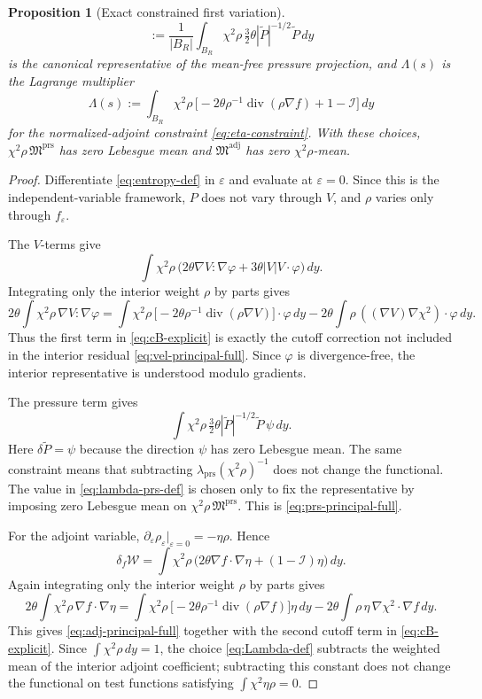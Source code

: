 \documentclass[11pt]{amsart}
\numberwithin{equation}{section}
\theoremstyle{plain}
\newtheorem{proposition}[theorem]{Proposition}
\theoremstyle{definition}
\theoremstyle{remark}
\newcommand{\Wloc}{\mathcal W}
\newcommand{\diver}{\operatorname{div}}
\begin{document}
\begin{proposition}[Exact constrained first variation]
\begin{equation}
	:=\frac1{|B_R|}\int_{B_R}\chi^2\rho\,
	\tfrac32\theta|\widetilde P|^{-1/2}\widetilde P\,dy
\end{equation}
is the canonical representative of the mean-free pressure projection, and
\(\Lambda(s)\) is the Lagrange multiplier
\begin{equation}\label{eq:Lambda-def}
	\Lambda(s):=\int_{B_R}\chi^2\rho\,
	\bigl[-2\theta\rho^{-1}\diver(\rho\nabla f)+1-\mathcal I\bigr]\,dy
\end{equation}
for the normalized-adjoint constraint \eqref{eq:eta-constraint}.  With these
choices, \(\chi^2\rho\,\mathfrak M^{\mathrm{prs}}\) has zero Lebesgue mean
and \(\mathfrak M^{\mathrm{adj}}\) has zero \(\chi^2\rho\)-mean.
\end{proposition}

\begin{proof}
Differentiate \eqref{eq:entropy-def} in \(\varepsilon\) and evaluate at
\(\varepsilon=0\).  Since this is the independent-variable framework,
\(P\) does not vary through \(V\), and \(\rho\) varies only through
\(f_\varepsilon\).

The \(V\)-terms give
\[
	\int\chi^2\rho\,
	\bigl(2\theta\nabla V:\nabla\varphi+3\theta|V|V\cdot\varphi\bigr)\,dy.
\]
Integrating only the interior weight \(\rho\) by parts gives
\[
	2\theta\int\chi^2\rho\,\nabla V:\nabla\varphi
	=\int\chi^2\rho\,
	\bigl[-2\theta\rho^{-1}\diver(\rho\nabla V)\bigr]\cdot\varphi\,dy
	-2\theta\int\rho\,((\nabla V)\nabla\chi^2)\cdot\varphi\,dy.
\]
Thus the first term in \eqref{eq:cB-explicit} is exactly the cutoff
correction not included in the interior residual
\eqref{eq:vel-principal-full}.  Since \(\varphi\) is divergence-free, the
interior representative is understood modulo gradients.

The pressure term gives
\[
	\int\chi^2\rho\,
	\tfrac32\theta|\widetilde P|^{-1/2}\widetilde P\,\psi\,dy.
\]
Here \(\delta\widetilde P=\psi\) because the direction \(\psi\) has zero
Lebesgue mean.  The same constraint means that subtracting
\(\lambda_{\mathrm{prs}}(\chi^2\rho)^{-1}\) does not change the functional.
The value in \eqref{eq:lambda-prs-def} is chosen only to fix the representative
by imposing zero Lebesgue mean on \(\chi^2\rho\,\mathfrak M^{\mathrm{prs}}\).
This is \eqref{eq:prs-principal-full}.

For the adjoint variable,
\(\partial_\varepsilon\rho_\varepsilon|_{\varepsilon=0}=-\eta\rho\).  Hence
\[
	\delta_f\Wloc
	=\int\chi^2\rho\,
	\bigl(2\theta\nabla f\cdot\nabla\eta+(1-\mathcal I)\eta\bigr)\,dy.
\]
Again integrating only the interior weight \(\rho\) by parts gives
\[
	2\theta\int\chi^2\rho\,\nabla f\cdot\nabla\eta
	=\int\chi^2\rho\,
	\bigl[-2\theta\rho^{-1}\diver(\rho\nabla f)\bigr]\eta\,dy
	-2\theta\int\rho\,\eta\,\nabla\chi^2\cdot\nabla f\,dy.
\]
This gives \eqref{eq:adj-principal-full} together with the second cutoff
term in \eqref{eq:cB-explicit}.  Since
\(\int\chi^2\rho\,dy=1\), the choice \eqref{eq:Lambda-def} subtracts the
weighted mean of the interior adjoint coefficient; subtracting this constant
does not change the functional on test functions satisfying
\(\int\chi^2\eta\rho=0\).
\end{proof}
\end{document}
